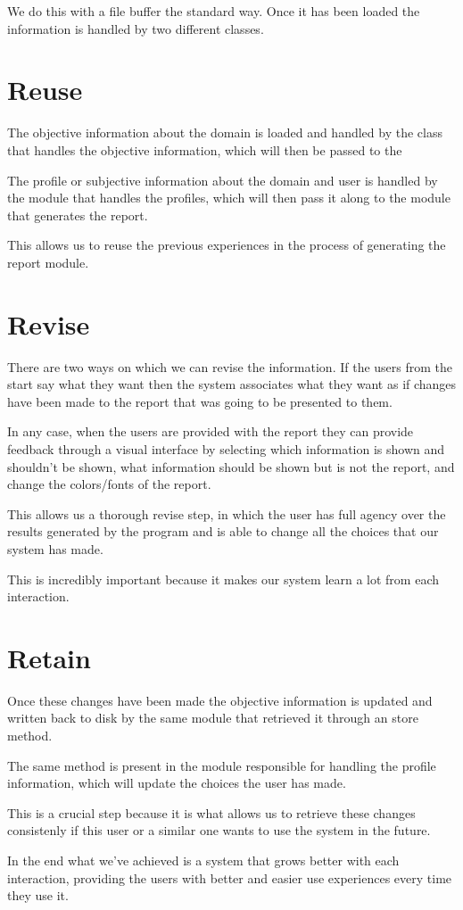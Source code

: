 We do this with a file buffer the standard way. Once it has been loaded the information is handled by two different classes.

\section{Reuse}
\label{cap6:sec:reuse}
The objective information about the domain is loaded and handled by the class that handles the objective information, which will then be passed to the 

The profile or subjective information about the domain and user is handled by the module that handles the profiles, which will then pass it along to the module that generates the report.

This allows us to reuse the previous experiences in the process of generating the report module.

\section{Revise}
\label{cap6:sec:revise}
There are two ways on which we can revise the information. If the users from the start say what they want then the system associates what they want as if changes have been made to the report that was going to be presented to them.

In any case, when the users are provided with the report they can provide feedback through a visual interface by selecting which information is shown and shouldn't be shown, what information should be shown but is not the report, and change the colors/fonts of the report.

This allows us a thorough revise step, in which the user has full agency over the results generated by the program and is able to change all the choices that our system has made.

This is incredibly important because it makes our system learn a lot from each interaction.

\section{Retain}
\label{cap6:sec:retain}
Once these changes have been made the objective information is updated and written back to disk by the same module that retrieved it through an store method.

The same method is present in the module responsible for handling the profile information, which will update the choices the user has made.

This is a crucial step because it is what allows us to retrieve these changes consistenly if this user or a similar one wants to use the system in the future.

In the end what we've achieved is a system that grows better with each interaction, providing the users with better and easier use experiences every time they use it.

